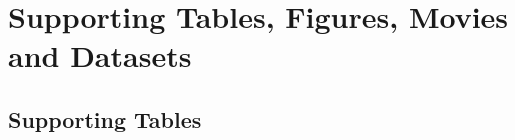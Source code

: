 \documentclass[11pt,a4paper, final]{article}
\begin{document}
\clearpage
\section{Supporting Tables, Figures, Movies and Datasets}
\subsection{Supporting Tables}
\setcounter{table}{0}
\makeatletter 
\renewcommand{\thetable}{S\@arabic\c@table}
\makeatother

\renewcommand*\listtablename{\vspace{-1.3cm}}
\listoftables
\end{document}
